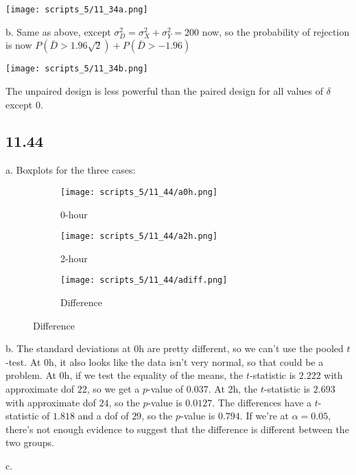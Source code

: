 \documentclass{article}
\begin{document}
\texttt{[image: scripts\_5/11\_34a.png]}

\noindent b. Same as above, except $\sigma_D^2=\sigma_X^2+\sigma_Y^2=200$ now, so the probability of rejection is now $P(\bar{D}>1.96\sqrt{2})+P(\bar{D}>-1.96)$

\texttt{[image: scripts\_5/11\_34b.png]}

The unpaired design is less powerful than the paired design for all values of $\delta$ except $0$.
\subsection*{11.44}
\FloatBarrier
a. Boxplots for the three cases:
\vspace{-400pt}
\begin{figure}
    \begin{subfigure}[b]{0.33\textwidth}
        \centering
        \texttt{[image: scripts\_5/11\_44/a0h.png]}
        \caption{0-hour}
    \end{subfigure}
    \begin{subfigure}[b]{0.33\textwidth}
        \centering
        \texttt{[image: scripts\_5/11\_44/a2h.png]}
        \caption{2-hour}
    \end{subfigure}
    \begin{subfigure}[b]{0.33\textwidth}
        \centering
        \texttt{[image: scripts\_5/11\_44/adiff.png]}
        \caption{Difference}
    \end{subfigure}
\end{figure}
\FloatBarrier
\noindent b. The standard deviations at 0h are pretty different, so we can't use the pooled $t$-test. At 0h, it also looks like the data isn't very normal, so that could be a problem. At 0h, if we test the equality of the means, the $t$-statistic is $2.222$ with approximate dof $22$, so we get a $p$-value of $0.037$.
At 2h, the $t$-statistic is $2.693$ with approximate dof $24$, so the $p$-value is $0.0127$. The differences have a $t$-statistic of $1.818$ and a dof of $29$, so the $p$-value is $0.794$. If we're at $\alpha=0.05$, there's not enough evidence to suggest that the difference is different between the two groups.

\noindent c.
\end{document}
